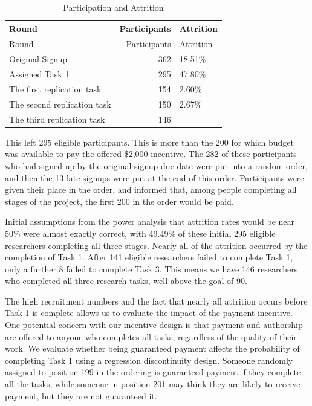 \documentclass[
  letterpaper,
  DIV=11,
  numbers=noendperiod]{scrartcl}
\begin{document}
\begin{longtable}[]{@{}lrl@{}}
\caption{Participation and
Attrition\label{tbl-attrition}}\tabularnewline
\toprule\noalign{}
Round & Participants & Attrition \\
\midrule\noalign{}
\endfirsthead
\toprule\noalign{}
Round & Participants & Attrition \\
\midrule\noalign{}
\endhead
\bottomrule\noalign{}
\endlastfoot
Original Signup & 362 & 18.51\% \\
Assigned Task 1 & 295 & 47.80\% \\
The first replication task & 154 & 2.60\% \\
The second replication task & 150 & 2.67\% \\
The third replication task & 146 & \\
\end{longtable}

This left 295 eligible participants. This is more than the 200 for which
budget was available to pay the offered \$2,000 incentive. The 282 of
these participants who had signed up by the original signup due date
were put into a random order, and then the 13 late signups were put at
the end of this order. Participants were given their place in the order,
and informed that, among people completing all stages of the project,
the first 200 in the order would be paid.

Initial assumptions from the power analysis that attrition rates would
be near 50\% were almost exactly correct, with 49.49\% of these initial
295 eligible researchers completing all three stages. Nearly all of the
attrition occurred by the completion of Task 1. After 141 eligible
researchers failed to complete Task 1, only a further 8 failed to
complete Task 3. This means we have 146 researchers who completed all
three research tasks, well above the goal of 90.

The high recruitment numbers and the fact that nearly all attrition
occurs before Task 1 is complete allows us to evaluate the impact of the
payment incentive. One potential concern with our incentive design is
that payment and authorship are offered to anyone who completes all
tasks, regardless of the quality of their work. We evaluate whether
being guaranteed payment affects the probability of completing Task 1
using a regression discontinuity design. Someone randomly assigned to
position 199 in the ordering is guaranteed payment if they complete all
the tasks, while someone in position 201 may think they are likely to
receive payment, but they are not guaranteed it.
\end{document}
